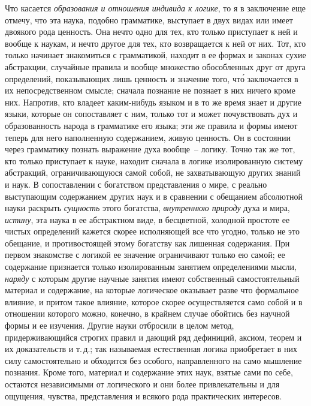 Что касается \emph{образования и отношения индивида
к логике}, то я в заключение еще отмечу, что эта наука,
подобно грамматике, выступает в двух видах или имеет
двоякого рода ценность. Она нечто одно для тех, кто
только приступает к ней и вообще к наукам, и нечто
другое для тех, кто возвращается к ней от них. Тот, кто
только начинает знакомиться с грамматикой, находит
в ее формах и законах сухие абстракции, случайные правила
и вообще множество обособленных друг от друга
определений, показывающих лишь ценность и значение
того, чт\'о заключается в их непосредственном смысле;
сначала познание не познает в них ничего кроме них.
Напротив, кто владеет каким-нибудь языком и в то же
время знает и другие языки, которые он сопоставляет
с ним, только тот и может почувствовать дух и образованность
народа в грамматике его языка; эти же правила
и формы имеют теперь для него наполненную содержанием,
живую ценность. Он в состоянии через грамматику
познать выражение духа вообще~-- логику. Точно
так же тот, кто только приступает к науке, находит сначала
в логике изолированную систему абстракций, ограничивающуюся
самой собой, не захватывающую других
знаний и наук. В сопоставлении с богатством представления
о мире, с реально выступающим содержанием
других наук и в сравнении с обещанием абсолютной
науки раскрыть \emph{сущность} этого богатства, \emph{внутреннюю
природу} духа и мира, \emph{истину}, эта наука в ее абстрактном
виде, в бесцветной, холодной простоте ее чистых
определений кажется скорее исполняющей все что угодно,
только не это обещание, и противостоящей этому богатству
как лишенная содержания. При первом знакомстве
с логикой ее значение ограничивают только ею самой;
ее содержание признается только изолированным
занятием определениями мысли, \emph{наряду} с которым другие
научные занятия имеют собственный самостоятельный
материал и содержание, на которые логическое оказывает
разве что формальное влияние, и притом такое
влияние, которое скорее осуществляется само собой и
в отношении которого можно, конечно, в крайнем случае
обойтись без научной формы и ее изучения. Другие
науки отбросили в целом метод, придерживающийся строгих
правил и дающий ряд дефиниций, аксиом, теорем и
их доказательств и т.\,д.; так называемая естественная
логика приобретает в них силу самостоятельно и обходится
без особого, направленного на само мышление познания.
Кроме того, материал и содержание этих наук,
взятые сами по себе, остаются независимыми от логического
и они более привлекательны и для ощущения, чувства,
представления и всякого рода практических интересов.


